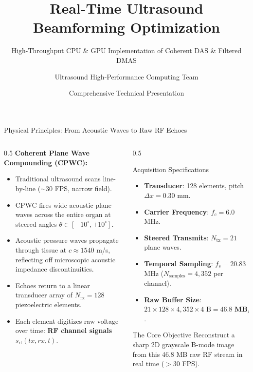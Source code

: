 \documentclass[aspectratio=169,10pt]{beamer}
\title[Real-Time Ultrasound Beamforming Optimization]{Real-Time Ultrasound Beamforming Optimization}
\subtitle{High-Throughput CPU \& GPU Implementation of Coherent DAS \& Filtered DMAS}
\author[Senior Capstone Project]{Ultrasound High-Performance Computing Team}
\institute[Biomedical \& Electrical Engineering]{Department of Electrical \& Biomedical Engineering}
\date[\today]{Comprehensive Technical Presentation}
\begin{document}
\begin{frame}
  \titlepage
\end{frame}

\begin{frame}{Physical Principles: From Acoustic Waves to Raw RF Echoes}
  \begin{columns}[T]
    \begin{column}{0.5\textwidth}
      \textbf{Coherent Plane Wave Compounding (CPWC):}
      \begin{itemize}
        \item Traditional ultrasound scans line-by-line ($\sim 30$ FPS, narrow field).
        \item CPWC fires wide acoustic plane waves across the entire organ at steered angles $\theta \in [-10^\circ, +10^\circ]$.
        \item Acoustic pressure waves propagate through tissue at $c \approx 1540$ m/s, reflecting off microscopic acoustic impedance discontinuities.
        \item Echoes return to a linear transducer array of $N_{\text{rx}} = 128$ piezoelectric elements.
        \item Each element digitizes raw voltage over time: \textbf{RF channel signals} $s_{\text{rf}}(tx, rx, t)$.
      \end{itemize}
    \end{column}
    \begin{column}{0.5\textwidth}
      \begin{block}{Acquisition Specifications}
        \begin{itemize}
          \item \textbf{Transducer}: 128 elements, pitch $\Delta x = 0.30$ mm.
          \item \textbf{Carrier Frequency}: $f_c = 6.0$ MHz.
          \item \textbf{Steered Transmits}: $N_{\text{tx}} = 21$ plane waves.
          \item \textbf{Temporal Sampling}: $f_s = 20.83$ MHz ($N_{\text{samples}} = 4,352$ per channel).
          \item \textbf{Raw Buffer Size}: $21 \times 128 \times 4,352 \times 4\text{ B} = \mathbf{46.8\text{ MB/frame}}$.
        \end{itemize}
      \end{block}
      \begin{alertblock}{The Core Objective}
        Reconstruct a sharp 2D grayscale B-mode image from this 46.8 MB raw RF stream in real time ($> 30$ FPS).
      \end{alertblock}
    \end{column}
  \end{columns}
\end{frame}
\end{document}
